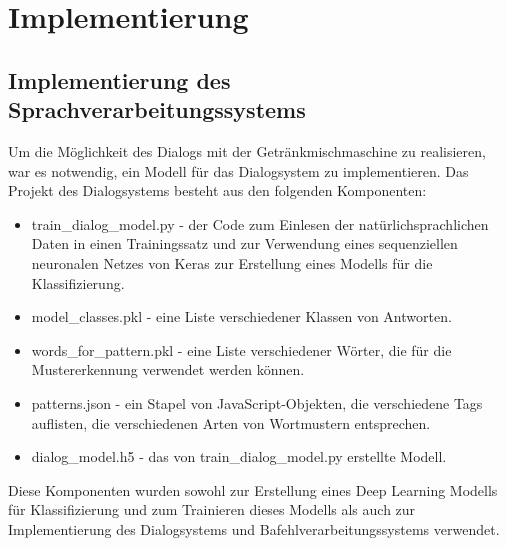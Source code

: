 \chapter{Implementierung}
\section{Implementierung des Sprachverarbeitungssystems}\label{section:Implementierung_Sprachverarbeitung}
Um die Möglichkeit des Dialogs mit der Getränkmischmaschine zu realisieren, war es notwendig, ein Modell für das Dialogsystem zu implementieren. Das Projekt des Dialogsystems besteht aus den folgenden Komponenten:
\begin{itemize}
    \item train\_dialog\_model.py - der Code zum Einlesen der natürlichsprachlichen Daten in einen Trainingssatz und zur Verwendung eines sequenziellen neuronalen Netzes von Keras zur Erstellung eines Modells für die Klassifizierung.
    \item model\_classes.pkl - eine Liste verschiedener Klassen von Antworten.
    \item words\_for\_pattern.pkl - eine Liste verschiedener Wörter, die für die Mustererkennung verwendet werden können.
    \item patterns.json - ein Stapel von JavaScript-Objekten, die verschiedene Tags auflisten, die verschiedenen Arten von Wortmustern entsprechen.
    \item dialog\_model.h5 - das von train\_dialog\_model.py erstellte Modell.
\end{itemize}
Diese Komponenten wurden sowohl zur Erstellung eines Deep Learning Modells für Klassifizierung und zum Trainieren dieses Modells als auch zur Implementierung des Dialogsystems und Bafehlverarbeitungssystems verwendet.
